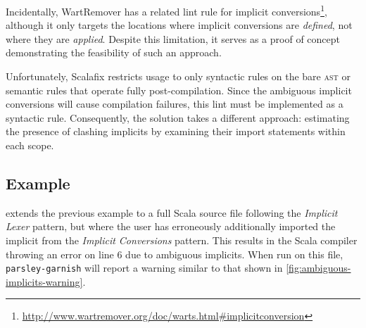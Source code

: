\documentclass[../../main.tex]{subfiles}
\begin{document}
Incidentally, WartRemover has a related lint rule for implicit conversions\footnote{\url{http://www.wartremover.org/doc/warts.html#implicitconversion}},
although it only targets the locations where implicit conversions are \emph{defined}, not where they are \emph{applied}.
Despite this limitation, it serves as a proof of concept demonstrating the feasibility of such an approach.

Unfortunately, Scalafix restricts usage to only syntactic rules on the bare \textsc{ast} or semantic rules that operate fully post-compilation.
Since the ambiguous implicit conversions will cause compilation failures, this lint must be implemented as a syntactic rule.
Consequently, the solution takes a different approach: estimating the presence of clashing implicits by examining their import statements within each scope.

\subsection{Example}
 extends the previous example to a full Scala source file following the \emph{Implicit Lexer} pattern,
but where the user has erroneously additionally imported the  implicit from the \emph{Implicit Conversions} pattern.
This results in the Scala compiler throwing an error on line 6 due to ambiguous implicits.
When run on this file, \texttt{parsley-garnish} will report a warning similar to that shown in \cref{fig:ambiguous-implicits-warning}.
\end{document}
